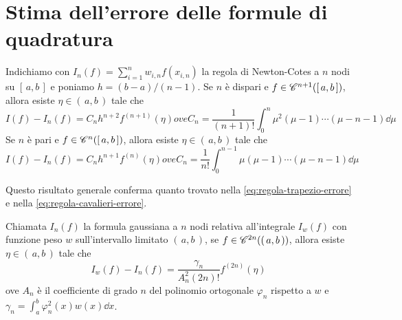 \section[Stima dell'errore]{Stima dell'errore delle formule di quadratura}
	
	\begin{teorema}
		Indichiamo con \(I_n (f) = \sum_{i = 1}^n w_{i, n} f (x_{i, n})\) la regola di Newton-Cotes a \(n\) nodi su \([\, a, b \,]\) e poniamo \(h = (b - a) / (n - 1)\). Se \(n\) è dispari e \(f \in \mathscr{C}^{n + 1} ([\, a, b \,])\), allora esiste \(\eta \in (\, a, b \,)\) tale che
		\begin{subequations}
			\begin{equation}
				I (f) - I_n (f) = C_n h^{n + 2} f^{(n + 1)} (\eta)
			\end{equation}
			ove
			\begin{equation}
				C_n = \frac{1}{(n + 1)!} \int_0^n \mu^2 (\mu - 1) \cdots (\mu - n - 1) \dd{\mu}
			\end{equation}
		\end{subequations}
		Se \(n\) è pari e \(f \in \mathscr{C}^{n} ([\, a, b \,])\), allora esiste \(\eta \in (\, a, b \,)\) tale che
		\begin{subequations}
			\begin{equation}
				I (f) - I_n (f) = C_n h^{n + 1} f^{(n)} (\eta)
			\end{equation}
			ove
			\begin{equation}
				C_n = \frac{1}{n!} \int_0^{n - 1} \mu (\mu - 1) \cdots (\mu - n - 1) \dd{\mu}
			\end{equation}
		\end{subequations}
	\end{teorema}

	Questo risultato generale conferma quanto trovato nella \eqref{eq:regola-trapezio-errore} e nella \eqref{eq:regola-cavalieri-errore}.
	
	\begin{teorema}
		Chiamata \(I_n (f)\) la formula gaussiana a \(n\) nodi relativa all'integrale \(I_w (f)\) con funzione peso \(w\) sull'intervallo limitato \((\, a, b \,)\), se \(f \in \mathscr{C}^{2 n} ((\, a, b \,))\), allora esiste \(\eta \in (\, a, b \,)\) tale che
		\begin{equation}
			I_w (f) - I_n (f) = \frac{\gamma_n}{A_n^2 (2 n)!} f^{(2 n)} (\eta)
		\end{equation}
		ove \(A_n\) è il coefficiente di grado \(n\) del polinomio ortogonale \(\varphi_n\) rispetto a \(w\) e \(\gamma_n = \int_a^b \varphi_n^2 (x) w (x) \dd{x}\).
	\end{teorema}


